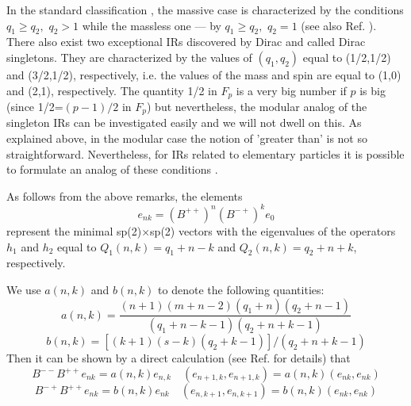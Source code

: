 \documentclass[a4paper,12pt]{article}%
\begin{document}
In the standard classification
\cite{Fronsdal, Evans}, the massive case is characterized by
the conditions $q_1\geq q_2,\,\,q_2>1$ while the massless
one --- by $q_1\geq q_2,\,\,q_2=1$ 
(see also Ref. \cite{lev2}). There also exist two exceptional
IRs discovered by Dirac \cite{DiracS} and called Dirac
singletons. They are characterized by the values of $(q_1,q_2)$
equal to (1/2,1/2) and (3/2,1/2), respectively, i.e. the 
values of the mass
and spin are equal to (1,0) and (2,1), respectively. 
The quantity
1/2 in $F_p$ is a very big number if $p$ is big 
(since 1/2=$(p-1)/2$ in $F_p$) but nevertheless, the modular
analog of the singleton IRs can be investigated easily \cite{lev1}
and we will not dwell on this. As
explained above, in the modular case the notion of 'greater
than' is not so straightforward. Nevertheless, for IRs
related to elementary particles it is possible to formulate
an analog of these conditions \cite{lev2}. 

As follows from the above remarks, the elements 
\begin{equation}
e_{nk}=(B^{++})^n(B^{-+})^ke_0
\label{15}
\end{equation}
represent the minimal sp(2)$\times$sp(2) vectors with the 
eigenvalues of the operators $h_1$ and $h_2$ equal to 
$Q_1(n,k)=q_1+n-k$ and $Q_2(n,k)=q_2+n+k$, respectively.

We use $a(n,k)$ and $b(n,k)$ to denote the following quantities: 
\begin{equation}
a(n,k)=\frac{(n+1)(m+n-2)(q_1+n)(q_2+n-1)}{(q_1+n-k-1)(q_2+n+k-1)}
\label{16}
\end{equation}
\begin{equation}
b(n,k)=[(k+1)(s-k)(q_2+k-1)]/(q_2+n+k-1)
\label{17}
\end{equation}
Then it can be shown by a direct calculation (see Ref. 
\cite{lev2} for details) that
\begin{equation}
B^{--}B^{++}e_{nk}=a(n,k)e_{n,k}\quad 
(e_{n+1,k},e_{n+1,k})=a(n,k)(e_{nk},e_{nk})
\label{18}
\end{equation}
\begin{equation}
B^{-+}B^{++}e_{nk}=b(n,k)e_{nk}\quad (e_{n,k+1},e_{n,k+1})=
b(n,k)(e_{nk},e_{nk})
\label{19}
\end{equation}
\end{document}
